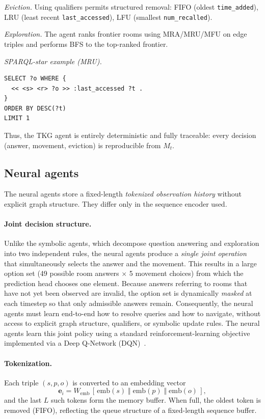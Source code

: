\documentclass[runningheads]{llncs}
\begin{document}
\emph{Eviction.}  
Using qualifiers permits structured removal:
FIFO (oldest \texttt{time\_added}),  
LRU (least recent \texttt{last\_accessed}),  
LFU (smallest \texttt{num\_recalled}).

\emph{Exploration.}  
The agent ranks frontier rooms using MRA/MRU/MFU on edge triples and
performs BFS to the top-ranked frontier.

\emph{SPARQL-star example (MRU).}
\begin{lstlisting}[language=SPARQL,basicstyle=\ttfamily\small,frame=single]
SELECT ?o WHERE {
  << <s> <r> ?o >> :last_accessed ?t .
}
ORDER BY DESC(?t)
LIMIT 1
\end{lstlisting}

Thus, the TKG agent is entirely deterministic and fully traceable: every
decision (answer, movement, eviction) is reproducible from $M_t$.

\subsection{Neural agents}

The neural agents store a fixed-length \emph{tokenized observation
history} without explicit graph structure. They differ only in the
sequence encoder used.

\paragraph{Joint decision structure.}
Unlike the symbolic agents, which decompose question answering and exploration into two independent rules, the neural agents produce a \emph{single joint operation} that simultaneously selects the answer and the movement. This results in a large option set (49 possible room answers $\times$ 5 movement choices) from which the prediction head chooses one element. Because answers referring to rooms that have not yet been observed are invalid, the option set is dynamically \emph{masked} at each timestep so that only admissible answers remain. Consequently, the neural agents must learn end-to-end how to resolve queries and how to navigate, without access to explicit graph structure, qualifiers, or symbolic update rules. The neural agents learn this joint policy using a standard reinforcement-learning objective implemented via a Deep Q-Network (DQN)~\cite{mnih2013playingatarideepreinforcement}.

\paragraph{Tokenization.}
Each triple $(s,p,o)$ is converted to an embedding vector
\[
\mathbf{e}_i
   = W_{\mathrm{emb}}\,[\,\mathrm{emb}(s)\;\Vert\;\mathrm{emb}(p)
      \;\Vert\;\mathrm{emb}(o)\,],
\]
and the last $L$ such tokens form the memory buffer. When full, the oldest token is removed (FIFO), reflecting the queue structure of a fixed-length sequence buffer.
\end{document}

